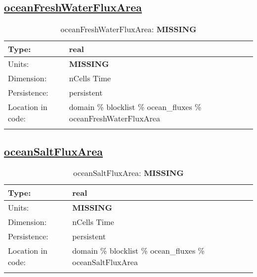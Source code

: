\subsection[oceanFreshWaterFluxArea]{\hyperref[sec:var_tab_ocean_fluxes]{oceanFreshWaterFluxArea}}
\label{subsec:var_sec_ocean_fluxes_oceanFreshWaterFluxArea}
\begin{center}
\begin{longtable}{| p{2.0in} | p{4.0in} |}
        \hline 
        Type: & real \\
        \hline 
        Units: & {\bf \color{red} MISSING} \\
        \hline 
        Dimension: & nCells Time \\
        \hline 
        Persistence: & persistent \\
        \hline 
         Location in code: & domain \% blocklist \% ocean\_fluxes \% oceanFreshWaterFluxArea \\
         \hline 
    \caption{oceanFreshWaterFluxArea: {\bf \color{red} MISSING}}
\end{longtable}
\end{center}
\subsection[oceanSaltFluxArea]{\hyperref[sec:var_tab_ocean_fluxes]{oceanSaltFluxArea}}
\label{subsec:var_sec_ocean_fluxes_oceanSaltFluxArea}
\begin{center}
\begin{longtable}{| p{2.0in} | p{4.0in} |}
        \hline 
        Type: & real \\
        \hline 
        Units: & {\bf \color{red} MISSING} \\
        \hline 
        Dimension: & nCells Time \\
        \hline 
        Persistence: & persistent \\
        \hline 
         Location in code: & domain \% blocklist \% ocean\_fluxes \% oceanSaltFluxArea \\
         \hline 
    \caption{oceanSaltFluxArea: {\bf \color{red} MISSING}}
\end{longtable}
\end{center}
